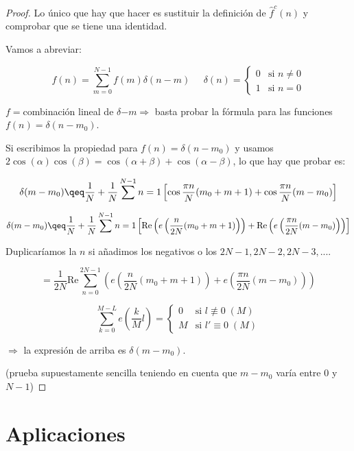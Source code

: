 	\begin{proof}
		Lo único que hay que hacer es sustituir la definición de $\hat{f}^c (n)$ y comprobar que se tiene una identidad.

		Vamos a abreviar:

		$$f(n) = \sum\limits^{N-1}_{m=0} f(m) \delta(n - m) \;\;\;\;\; \delta(n) = \begin{cases}
			0 & \mbox{si } n \neq 0 \\
			1 & \mbox{si } n = 0
		\end{cases}$$

		$f = $combinación lineal de $\delta{-m} \Rightarrow $ basta probar la fórmula para las funciones $f(n) = \delta(n- m_0)$.

		Si escribimos la propiedad para $f(n) = \delta(n - m_0)$ y usamos $2 \cos{(\alpha)} \cos{(\beta)} = \cos{(\alpha + \beta)} + \cos{(\alpha - \beta)}$, lo que hay que probar es:

		$$ \delta(m - m_0) \qeq \frac{1}{N} + \frac{1}{N} \sum\limits^{N-1}{n = 1} \left[ \cos{\frac{\pi n}{N} (m_0 + m + 1)} + \cos{\frac{\pi n}{N} (m - m_0)}   \right] $$

		$$ \delta(m - m_0) \qeq \frac{1}{N} + \frac{1}{N} \sum\limits^{N-1}{n = 1} \left[ \text{Re} \left( e \left( \frac{n}{2N} (m_0 + m + 1) \right) \right) + \text{Re} \left( e \left( \frac{\pi n}{2N} (m - m_0) \right) \right)   \right] $$

		Duplicaríamos la $n$ si añadimos los negativos o los $2N-1, 2N-2, 2N-3,...$.

		$$ = \frac{1}{2N} \text{Re} \sum\limits^{2N-1}_{n=0} \left( e \left( \frac{n}{2N} (m_0 + m + 1) \right) + e \left( \frac{\pi n}{2N} (m - m_0) \right) \right) $$

		$$ \sum\limits^{M - L}_{k = 0} e \left( \frac{k}{M} l \right) = \begin{cases}
			0 & \mbox{si } l \not\equiv 0 \; (M) \\
			M & \mbox{si } l' \equiv 0 \; (M)
		\end{cases}$$

		$\Rightarrow$ la expresión de arriba es $\delta(m - m_0).$

		(prueba supuestamente sencilla teniendo en cuenta que $m-m_0$ varía entre 0 y $N-1$)

	\end{proof}


\section{Aplicaciones}

